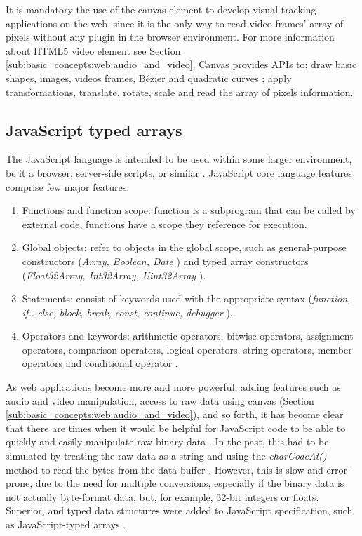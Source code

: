 It is mandatory the use of the canvas element to develop visual tracking applications on the web, since it is the only way to read video frames' array of pixels without any plugin in the browser environment. For more information about HTML5 video element see Section \ref{sub:basic_concepts:web:audio_and_video}. Canvas provides APIs to: draw basic shapes, images, videos frames, Bézier \cite{piegl1993fundamental} and quadratic curves \cite{piegl1993fundamental,Hartley2004}; apply transformations, translate, rotate, scale and read the array of pixels information.


\subsection{JavaScript typed arrays} %
\label{sub:basic_concepts:web:javascript_typed_arrays}

The JavaScript language \cite{International2009} is intended to be used within some larger environment, be it a browser, server-side scripts, or similar \cite{Grosskurth2005}. JavaScript core language features comprise few major features:

\begin{enumerate}
\item Functions and function scope: function is a subprogram that can be called by external code, functions have a scope they reference for execution.
\item Global objects: refer to objects in the global scope, such as general-purpose constructors (\textit{Array, Boolean, Date} \etc) and typed array constructors (\textit{Float32Array, Int32Array, Uint32Array} \etc).
\item Statements: consist of keywords used with the appropriate syntax (\textit{function, if...else, block, break, const, continue, debugger \etc}).
\item Operators and keywords: arithmetic operators, bitwise operators, assignment operators, comparison operators, logical operators, string operators, member operators and conditional operator \cite{MDN2013}.
\end{enumerate}

As web applications become more and more powerful, adding features such as audio and video manipulation, access to raw data using canvas (Section \ref{sub:basic_concepts:web:audio_and_video}), and so forth, it has become clear that there are times when it would be helpful for JavaScript code to be able to quickly and easily manipulate raw binary data \cite{Canvas2013,TypedArray2013}. In the past, this had to be simulated by treating the raw data as a string and using the \textit{charCodeAt()} method to read the bytes from the data buffer \cite{MDN2013,TypedArray2013}. However, this is slow and error-prone, due to the need for multiple conversions, especially if the binary data is not actually byte-format data, but, for example, 32-bit integers or floats. Superior, and typed data structures were added to JavaScript specification, such as JavaScript-typed arrays \cite{MDN2013,International2009}.

